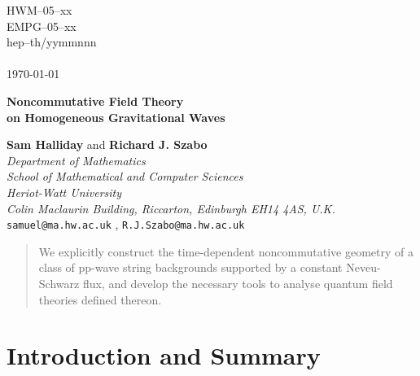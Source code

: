 \documentclass[11pt,a4paper]{article}
\renewcommand{\thefootnote}{\fnsymbol{footnote}}
\newcommand{\newsection}{\setcounter{equation}{0}\section}
\begin{document}
\begin{titlepage}
\begin{flushright}

\baselineskip=12pt

HWM--05--xx\\
EMPG--05--xx\\
hep--th/yymmnnn\\
\hfill{ }\\
\today
\end{flushright}

\begin{center}

\vspace{2cm}

\baselineskip=24pt

{\Large\bf Noncommutative Field Theory \\ on Homogeneous Gravitational
  Waves}

\baselineskip=14pt

\vspace{1cm}

{\bf Sam Halliday} and {\bf Richard J. Szabo}
\\[4mm]
{\it Department of Mathematics\\ School of Mathematical and Computer
  Sciences\\ Heriot-Watt University\\ Colin Maclaurin Building,
  Riccarton, Edinburgh EH14 4AS, U.K.}
\\{\tt samuel@ma.hw.ac.uk} , {\tt R.J.Szabo@ma.hw.ac.uk}
\\[40mm]

\end{center}

\begin{abstract}

\baselineskip=12pt

We explicitly construct the time-dependent noncommutative geometry of
a class of pp-wave string backgrounds supported by a constant Neveu-Schwarz
flux, and develop the necessary tools to analyse quantum field
theories defined thereon.

\end{abstract}

\end{titlepage}
\setcounter{page}{2}

\newpage

\renewcommand{\thefootnote}{\arabic{footnote}} \setcounter{footnote}{0}

\newsection{Introduction and Summary\label{Intro}}
\end{document}
